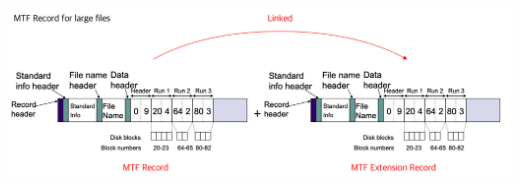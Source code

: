 \documentclass[12pt]{article}
\begin{document}
\begin{itemize}
\begin{itemize}
        \begin{center}
        \includegraphics[width=\linewidth]{images/notes_12.png}
        \end{center}
    \end{itemize}
\end{itemize}
\end{document}
